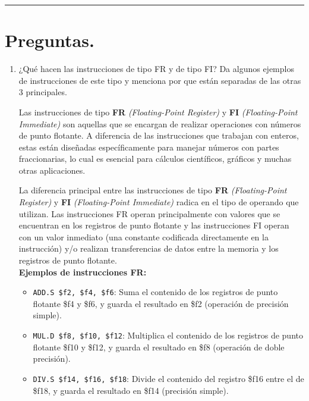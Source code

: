 \documentclass[12pt,letterpaper]{article}
\begin{document}
\bigskip
\hrule height 0.1pt
\bigskip

\section*{Preguntas.}

\begin{enumerate}
\item ¿Qué hacen las instrucciones de tipo FR y de tipo FI? Da algunos ejemplos de instrucciones de este tipo y menciona por que están separadas de las otras 3 principales.
  \bigskip
  
  Las instrucciones de tipo \textbf{FR} \textit{(Floating-Point Register)} y \textbf{FI} \textit{(Floating-Point Immediate)} son aquellas que se encargan de realizar operaciones con números de punto flotante. A diferencia de las instrucciones que trabajan con enteros, estas están diseñadas específicamente para manejar números con partes fraccionarias, lo cual es esencial para cálculos científicos, gráficos y muchas otras aplicaciones.
  
  La diferencia principal entre las instrucciones de tipo \textbf{FR} \textit{(Floating-Point Register)} y \textbf{FI} \textit{(Floating-Point Immediate)} radica en el tipo de operando que utilizan. Las instrucciones FR operan principalmente con valores que se encuentran en los registros de punto flotante y las instrucciones FI operan con un valor inmediato (una constante codificada directamente en la instrucción) y/o realizan transferencias de datos entre la memoria y los registros de punto flotante.\\

  \textbf{Ejemplos de instrucciones FR:}
  
  \begin{itemize}
  \item \texttt{ADD.S \$f2, \$f4, \$f6}:
    Suma el contenido de los registros de punto flotante \$f4 y \$f6, y guarda el resultado en \$f2 (operación de precisión simple).
    
  \item \texttt{MUL.D \$f8, \$f10, \$f12}:
    Multiplica el contenido de los registros de punto flotante \$f10 y \$f12, y guarda el resultado en \$f8 (operación de doble precisión).
    
  \item \texttt{DIV.S \$f14, \$f16, \$f18}:
    Divide el contenido del registro \$f16 entre el de \$f18, y guarda el resultado en \$f14 (precisión simple).
    

\end{itemize}
\end{enumerate}
\end{document}

